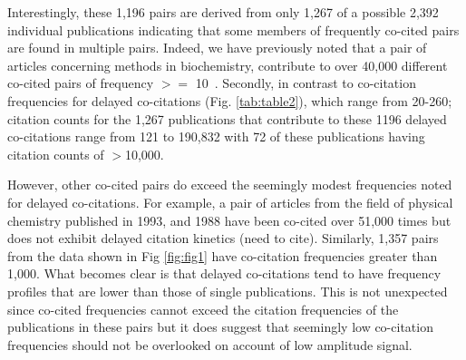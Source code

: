 \documentclass[utf8]{frontiersSCNS}
\begin{document}
Interestingly, these 1,196 pairs are derived from only 1,267 of a possible 2,392 individual publications indicating that some members of frequently co-cited pairs are found in multiple pairs. Indeed, we have previously noted that a pair of articles concerning methods in biochemistry, contribute to over 40,000 different co-cited pairs of frequency $>=$ 10~\citep{devarakonda_2020}.  Secondly, in contrast to co-citation frequencies for delayed co-citations (Fig. \ref{tab:table2}), which range from 20-260; citation counts for the 1,267 publications that contribute to these 1196 delayed co-citations range from 121 to 190,832 with 72 of these publications having citation counts of $>$10,000. 

However, other co-cited pairs do exceed the seemingly modest frequencies noted for delayed co-citations. For example, a pair of articles from the field of physical chemistry published in 1993, and 1988 have been co-cited over 51,000 times but does not exhibit delayed citation kinetics (need to cite). Similarly, 1,357 pairs from the data shown in Fig \ref{fig:fig1} have co-citation frequencies greater than 1,000. What becomes clear is that delayed co-citations tend to have frequency profiles that are lower than those of single publications. This is not unexpected since co-cited frequencies cannot exceed the citation frequencies of the publications in these pairs but it does suggest that seemingly low co-citation frequencies should not be overlooked on account of low amplitude signal. 
\end{document}
